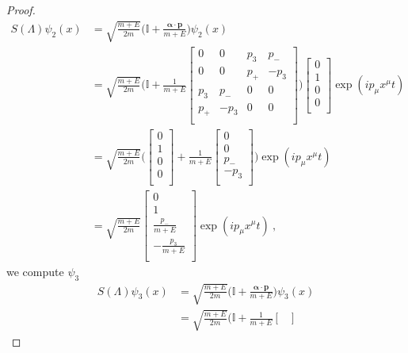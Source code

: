 \begin{proof}
\begin{equation*}
        \begin{aligned}
            S(\Lambda) \psi_2 (x) & = \sqrt{\frac{m + E}{2m}} \Big ( \mathbb I + \frac{\boldsymbol \alpha \cdot \mathbf p}{m + E}\Big) \psi_2 (x) \\ & = \sqrt{\frac{m + E}{2m}} \Big ( \mathbb I + \frac{1}{m + E} \begin{bmatrix}
                0 & 0 & p_3 & p_- \\
                0 & 0 & p_+ & - p_3 \\
                p_3 & p_- & 0 & 0 \\
                p_+ & -p_3 & 0 & 0 \\
            \end{bmatrix} \Big) \begin{bmatrix}
                0 \\ 1 \\ 0 \\ 0 \\
            \end{bmatrix} \exp(i p_\mu x^\mu t) \\ & = \sqrt{\frac{m + E}{2m}} \Big ( \begin{bmatrix}
                0 \\ 1 \\ 0 \\ 0 \\
            \end{bmatrix} + \frac{1}{m + E} \begin{bmatrix}
                0 \\ 0 \\ p_- \\ - p_3 \\
            \end{bmatrix} \Big) \exp(i p_\mu x^\mu t) \\ & = \sqrt{\frac{m + E}{2m}} \begin{bmatrix}
                0 \\ 1 \\ \frac{p_-}{m + E} \\ - \frac{p_3}{m + E} \\
            \end{bmatrix} \exp(ip_\mu x^\mu t) ~,
        \end{aligned}
        \end{equation*}
        we compute $\psi_3$ 
        \begin{equation*}
        \begin{aligned}
            S(\Lambda) \psi_3 (x) & = \sqrt{\frac{m + E}{2m}} \Big ( \mathbb I + \frac{\boldsymbol \alpha \cdot \mathbf p}{m + E}\Big) \psi_3 (x) \\ & = \sqrt{\frac{m + E}{2m}} \Big ( \mathbb I + \frac{1}{m + E} \begin{bmatrix}

\end{bmatrix}
\end{aligned}
\end{equation*}
\end{proof}
